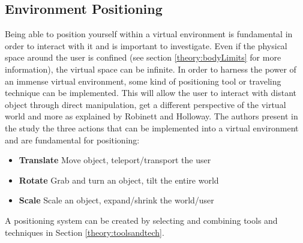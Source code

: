 \subsection{Environment Positioning}
Being able to position yourself within a virtual environment is fundamental in order to interact with it and is important to investigate\cite{tools:warren2014perception}. Even if the physical space around the user is confined (see section \ref{theory:bodyLimits} for more information), the virtual space can be infinite. In order to harness the power of an immense virtual environment, some kind of positioning tool or traveling technique can be implemented. This will allow the user to interact with distant object through direct manipulation, get a different perspective of the virtual world and more as explained by Robinett and Holloway\cite{positioning:Robinett1992}. The authors present in the study the three actions that can be implemented into a virtual environment and are fundamental for positioning:
\begin{itemize}
  \item \textbf{Translate} Move object, teleport/transport the user
  \item \textbf{Rotate} Grab and turn an object, tilt the entire world
  \item \textbf{Scale} Scale an object, expand/shrink the world/user
\end{itemize}

A positioning system can be created by selecting and combining tools and techniques in Section \ref{theory:toolsandtech}.
